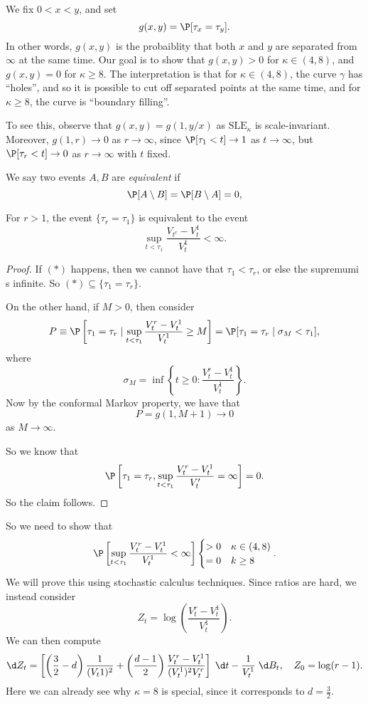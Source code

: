 \documentclass[a4paper]{article}
\newcommand\SLE{\mathrm{SLE}}
\begin{document}
We fix $0 < x < y$, and set
\[
  g(x, y)  =\P[\tau_x = \tau_y].
\]
In other words, $g(x, y)$ is the probaiblity that both $x$ and $y$ are separated from $\infty$ at the same time. Our goal is to show that $g(x, y) > 0$ for $\kappa \in (4, 8)$, and $g(x, y) = 0$ for $\kappa \geq 8$. The interpretation is that for $\kappa \in (4, 8)$, the curve $\gamma$ has ``holes'', and so it is possible to cut off separated points at the same time, and for $\kappa \geq 8$, the curve is ``boundary filling''.

To see this, observe that $g(x, y) = g(1, y/x)$ as $\SLE_\kappa$ is scale-invariant. Moreover, $g(1, r) \to 0$ as $r \to \infty$, since $\P[\tau_1 < t] \to 1$ as $t \to \infty$, but $\P[\tau_r < t] \to 0$ as $r \to \infty$ with $t$ fixed.

\begin{defi}
  We say two events $A, B$ are \emph{equivalent} if
  \[
    \P[A \setminus B] = \P[B \setminus A] = 0,
  \]
\end{defi}

\begin{prop}
  For $r > 1$, the event $\{\tau_r = \tau_1\}$ is equivalent to the event
  \[
    \sup_{t < \tau_1} \frac{V_{t^r} - V_t^1}{V_t^1} < \infty.\tag{$*$}
  \]
\end{prop}

\begin{proof}
  If $(*)$ happens, then we cannot have that $\tau_1 < \tau_r$, or else the supremumi s infinite. So $(*) \subseteq \{\tau_1 = \tau_r\}$.

  On the other hand, if $M > 0$, then consider
  \[
    P \equiv \P\left[\tau_1 = \tau_r \mid \sup_{t < \tau_1} \frac{V_t^r - V_t^1}{V_t^1} \geq M\right] = \P[\tau_1 = \tau_r \mid \sigma_M < \tau_1],
  \]
  where
  \[
    \sigma_M = \inf \left\{t \geq 0: \frac{V_t^r - V_t^1}{V_t^1}\right\}.
  \]
  Now by the conformal Markov property, we have that
  \[
    P = g(1, M + 1) \to 0
  \]
  as $M \to \infty$.

  So we know that
  \[
    \P\left[\tau_1 = \tau_r, \sup_{t < \tau_1} \frac{V_t^r - V_t^1}{V_t'} = \infty\right] = 0.
  \]
  So the claim follows.
\end{proof}

So we need to show that
\[
  \P\left[\sup_{t < \tau_1} \frac{V_t^r - V_t^1}{V_t^1} < \infty\right] 
  \begin{cases}
    >0 & \kappa \in (4, 8)\\
    =0 & k \geq 8
  \end{cases}.
\]
We will prove this using stochastic calculus techniques. Since ratios are hard, we instead consider
\[
  Z_t = \log \left(\frac{V_t^r - V_t^1}{V_t^1}\right).
\]
We can then compute
\[
  \d Z_t = \left[\left(\frac{3}{2} - d\right)\frac{1}{(V_t1)^2} + \left(\frac{d - 1}{2}\right) \frac{V_t^r - V_t^1}{(V_t^1)^2 V_t^r}\right] \;\d t - \frac{1}{V_t^1} \;\d B_t,\quad Z_0 = \log (r - 1).
\]
Here we can already see why $\kappa = 8$ is special, since it corresponds to $d = \frac{3}{2}$.
\end{document}
